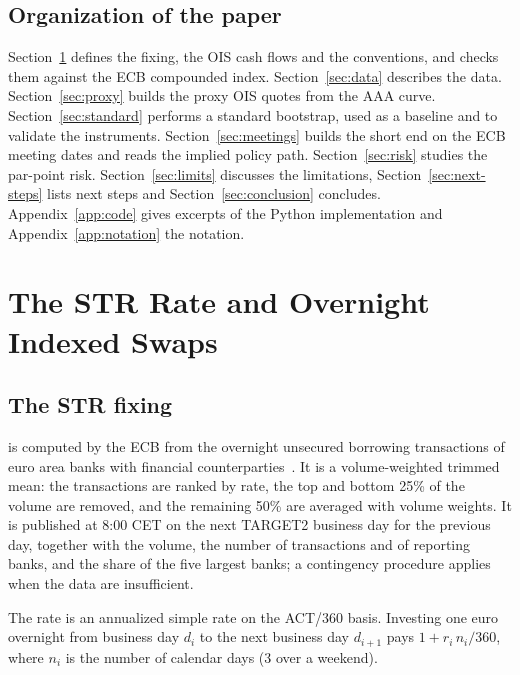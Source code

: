 \documentclass[11pt,a4paper]{article}
\theoremstyle{plain}
\theoremstyle{definition}
\newcommand{\estr}{\text{\texteuro STR}}
\begin{document}
\subsection{Organization of the paper}
Section~\ref{sec:prelim} defines the \estr{} fixing, the OIS cash flows and the conventions, and checks them against the ECB compounded index. Section~\ref{sec:data} describes the data. Section~\ref{sec:proxy} builds the proxy OIS quotes from the AAA curve. Section~\ref{sec:standard} performs a standard bootstrap, used as a baseline and to validate the instruments. Section~\ref{sec:meetings} builds the short end on the ECB meeting dates and reads the implied policy path. Section~\ref{sec:risk} studies the par-point risk. Section~\ref{sec:limits} discusses the limitations, Section~\ref{sec:next-steps} lists next steps and Section~\ref{sec:conclusion} concludes. Appendix~\ref{app:code} gives excerpts of the Python implementation and Appendix~\ref{app:notation} the notation.

\clearpage
\section{The \texteuro STR Rate and Overnight Indexed Swaps}
\label{sec:prelim}

\subsection{The \texteuro STR fixing}
\estr{} is computed by the ECB from the overnight unsecured borrowing transactions of euro area banks with financial counterparties~\cite{ecbestr}. It is a volume-weighted trimmed mean: the transactions are ranked by rate, the top and bottom 25\% of the volume are removed, and the remaining 50\% are averaged with volume weights. It is published at 8:00 CET on the next TARGET2 business day for the previous day, together with the volume, the number of transactions and of reporting banks, and the share of the five largest banks; a contingency procedure applies when the data are insufficient.

The rate is an annualized simple rate on the ACT/360 basis. Investing one euro overnight from business day $d_i$ to the next business day $d_{i+1}$ pays $1+r_i\,n_i/360$, where $n_i$ is the number of calendar days (3 over a weekend).
\end{document}
